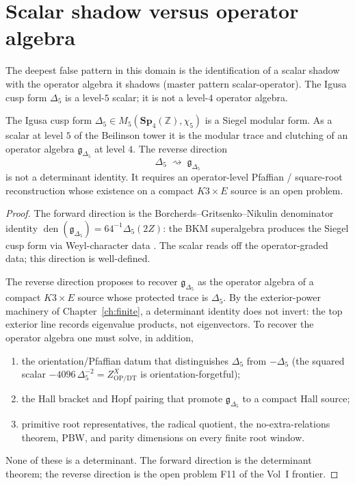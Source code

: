 \documentclass[11pt]{memoir}
\providecommand{\bZ}{\mathbb{Z}}
\providecommand{\fg}{\mathfrak{g}}
\providecommand{\Sp}{\mathbf{Sp}}
\begin{document}
\section{Scalar shadow versus operator algebra}
\label{sec:vd-ma-11}

The deepest false pattern in this domain is the identification of a
scalar shadow with the operator algebra it shadows (master pattern
scalar-operator). The Igusa cusp form $\Delta_5$ is a level-$5$ scalar; it is
not a level-$4$ operator algebra.

\begin{proposition}
\label{prop:ma-11-Delta5}
The Igusa cusp form $\Delta_5 \in M_5(\Sp_4(\bZ), \chi_5)$ is a Siegel
modular form. As a scalar at level $5$ of the Beilinson tower it is
the modular trace and clutching of an operator algebra $\fg_{\Delta_5}$
at level $4$. The reverse direction
\[
  \Delta_5 \;\rightsquigarrow\; \fg_{\Delta_5}
\]
is not a determinant identity. It requires an operator-level
Pfaffian / square-root reconstruction whose existence on a compact
$K3 \times E$ source is an open problem.
\end{proposition}

\begin{proof}
The forward direction is the Borcherds--Gritsenko--Nikulin denominator
identity $\operatorname{den}(\fg_{\Delta_5}) = 64^{-1}\Delta_5(2Z)$:
the BKM superalgebra produces the Siegel cusp form via Weyl-character
data \cite{Borcherds1995, GritsenkoNikulin1998}. The scalar reads off
the operator-graded data; this direction is well-defined.

The reverse direction proposes to recover $\fg_{\Delta_5}$ as the
operator algebra of a compact $K3 \times E$ source whose protected
trace is $\Delta_5$. By the exterior-power machinery of
Chapter~\ref{ch:finite}, a determinant identity does not invert: the
top exterior line records eigenvalue products, not eigenvectors. To
recover the operator algebra one must solve, in addition,
\begin{enumerate}
\item the orientation/Pfaffian datum that distinguishes $\Delta_5$ from
  $-\Delta_5$ (the squared scalar
  $-4096\,\Delta_5^{-2} = Z^X_{\mathrm{OP/DT}}$ is
  orientation-forgetful);
\item the Hall bracket and Hopf pairing that promote
  $\fg_{\Delta_5}$ to a compact Hall source;
\item primitive root representatives, the radical quotient, the
  no-extra-relations theorem, PBW, and parity dimensions on every
  finite root window.
\end{enumerate}
None of these is a determinant. The forward direction is the
determinant theorem; the reverse direction is the open problem
F11 of the Vol~I frontier.
\end{proof}
\end{document}
